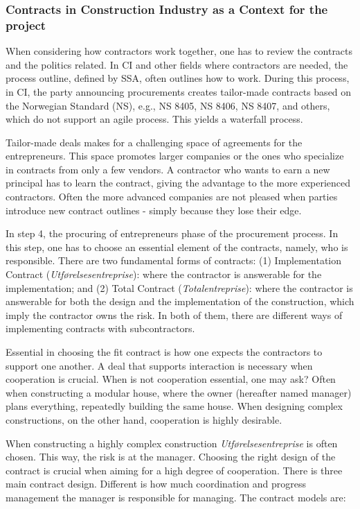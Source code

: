 \subsubsection*{Contracts in Construction Industry as a Context for the project}
When considering how contractors work together, one has to review the contracts and the politics related. In CI and other fields where contractors are needed, the process outline, defined by SSA, often outlines how to work. During this process, in CI, the party announcing procurements creates tailor-made contracts based on the Norwegian Standard (NS), e.g., NS 8405, NS 8406, NS 8407, and others, which do not support an agile process. This yields a waterfall process. 

Tailor-made deals makes for a challenging space of agreements for the entrepreneurs. This space promotes larger companies or the ones who specialize in contracts from only a few vendors. A contractor who wants to earn a new principal has to learn the contract, giving the advantage to the more experienced contractors. Often the more advanced companies are not pleased when parties introduce new contract outlines - simply because they lose their edge. 

In step 4, the procuring of entrepreneurs phase of the procurement process. In this step, one has to choose an essential element of the contracts, namely, who is responsible. There are two fundamental forms of contracts: (1) Implementation Contract (\textit{Utførelsesentreprise}): where the contractor is answerable for the implementation; and (2) Total Contract (\textit{Totalentreprise}): where the contractor is answerable for both the design and the implementation of the construction, which imply the contractor owns the risk. In both of them, there are different ways of implementing contracts with subcontractors. 

Essential in choosing the fit contract is how one expects the contractors to support one another. A deal that supports interaction is necessary when cooperation is crucial. When is not cooperation essential, one may ask? Often when constructing a modular house, where the owner (hereafter named manager) plans everything, repeatedly building the same house. When designing complex constructions, on the other hand, cooperation is highly desirable. 

When constructing a highly complex construction \textit{Utførelsesentreprise} is often chosen. This way, the risk is at the manager. Choosing the right design of the contract is crucial when aiming for a high degree of cooperation. There is three main contract design. Different is how much coordination and progress management the manager is responsible for managing. The contract models are: 

